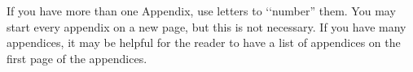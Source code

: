 If you have more than one Appendix, use letters to ‘‘number” them. You may start every appendix on a new page, but this is not necessary. If you have many appendices, it may be helpful for the reader to have a list of appendices on the first page of the appendices.
